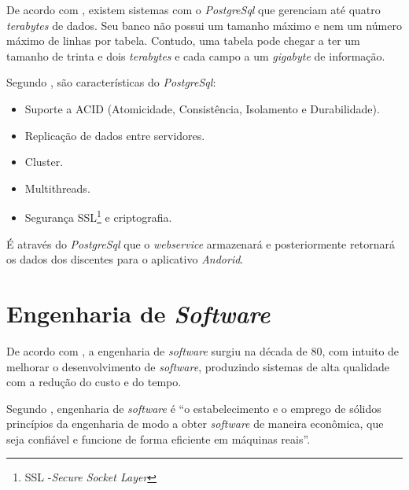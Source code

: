 	\par De acordo com , existem sistemas com o
\textit{PostgreSql} que gerenciam até quatro \textit{terabytes} de dados. Seu
banco não possui um tamanho máximo e nem um número máximo de linhas por tabela.
Contudo, uma tabela pode chegar a ter um tamanho de trinta e dois
\textit{terabytes} e cada campo a um \textit{gigabyte} de informação.

	\par Segundo , são características do
\textit{PostgreSql}:

	\begin{itemize}
	  
	  \item Suporte a ACID (Atomicidade, Consistência, Isolamento e Durabilidade). 
	  
	  \item Replicação de dados entre servidores.
	  
	  \item Cluster.
	  
	  \item Multithreads.
	  
	  \item Segurança SSL\footnote{SSL -\textit{Secure Socket Layer}} e
	  criptografia.
	    
	\end{itemize}

	\par É através do \textit{PostgreSql} que o \textit{webservice} armazenará e
posteriormente retornará os dados dos discentes para o aplicativo
\textit{Andorid}.

\section{Engenharia de \textit{Software}}

	\par De acordo com , a engenharia de \textit{software}
surgiu na década de 80, com intuito de melhorar o desenvolvimento de
\textit{software}, produzindo sistemas de alta qualidade com a redução do custo
e do tempo.

	\par Segundo , engenharia de \textit{software} é
“o estabelecimento e o emprego de sólidos princípios da engenharia de modo a
obter \textit{software} de maneira econômica, que seja confiável e funcione de
forma eficiente em máquinas reais”.

